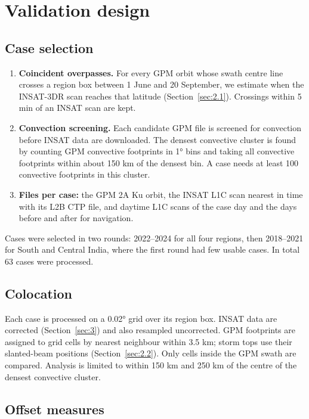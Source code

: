 \section{Validation design}
\label{sec:validation}
\label{sec:4}

\subsection{Case selection}\label{sec:4.1}

\begin{enumerate}
\def\labelenumi{\arabic{enumi}.}
\tightlist
\item
  \textbf{Coincident overpasses.} For every GPM orbit whose swath centre line crosses a region box between 1 June and 20 September, we estimate when the INSAT-3DR scan reaches that latitude (Section~\ref{sec:2.1}). Crossings within 5 min of an INSAT scan are kept.
\item
  \textbf{Convection screening.} Each candidate GPM file is screened for convection before INSAT data are downloaded. The densest convective cluster is found by counting GPM convective footprints in 1° bins and taking all convective footprints within about 150 km of the densest bin. A case needs at least 100 convective footprints in this cluster.
\item
  \textbf{Files per case:} the GPM 2A Ku orbit, the INSAT L1C scan nearest in time with its L2B CTP file, and daytime L1C scans of the case day and the days before and after for navigation.
\end{enumerate}

Cases were selected in two rounds: 2022--2024 for all four regions, then 2018--2021 for South and Central India, where the first round had few usable cases. In total 63 cases were processed.

\subsection{Colocation}\label{sec:4.2}

Each case is processed on a 0.02° grid over its region box. INSAT data are corrected (Section~\ref{sec:3}) and also resampled uncorrected. GPM footprints are assigned to grid cells by nearest neighbour within 3.5 km; storm tops use their slanted-beam positions (Section~\ref{sec:2.2}). Only cells inside the GPM swath are compared. Analysis is limited to within 150 km and 250 km of the centre of the densest convective cluster.

\subsection{Offset measures}\label{sec:4.3}

